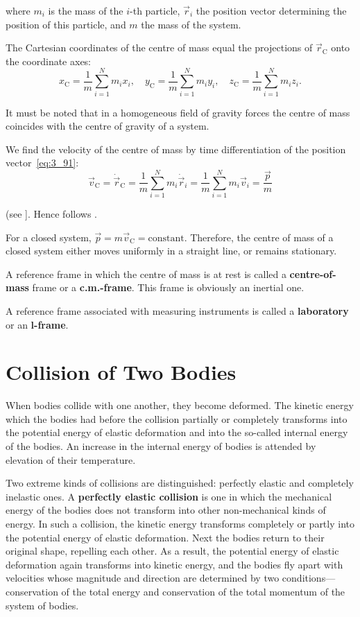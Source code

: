 \noindent
where $m_i$ is the mass of the $i$-th particle, $\vec{r}_i$ the position vector determining the position of this particle, and  $m$ the mass of the system.

The Cartesian coordinates of the centre of mass equal the projections of $\vec{r}_{\text{C}}$ onto the coordinate axes:
\begin{equation}\label{eq:3_92}
x_{\text{C}} = \frac{1}{m} \sum_{i=1}^N m_i x_i,\quad y_{\text{C}} = \frac{1}{m} \sum_{i=1}^N m_i y_i,\quad
z_{\text{C}} = \frac{1}{m} \sum_{i=1}^N m_i z_i.
\end{equation}

\noindent
It must be noted that in a homogeneous field of gravity forces the centre of mass coincides with the centre of gravity of a system.

We find the velocity of the centre of mass by time differentiation of the position vector~\eqref{eq:3_91}:
\begin{equation*}
\vec{v}_{\text{C}} = \dot{\vec{r}}_{\text{C}} = \frac{1}{m}\sum_{i=1}^N m_i\dot{\vec{r}}_i = \frac{1}{m} \sum_{i=1}^N m_i\vec{v}_i = \frac{\vec{p}}{m}
\end{equation*}

\noindent
(see ]. Hence follows .

For a closed system, $\vec{p}=m\vec{v}_{\text{C}}=\text{constant}$. Therefore, the centre of mass of a closed system either moves uniformly in a straight line, or remains stationary.

A reference frame in which the centre of mass is at rest is called a \textbf{centre-of-mass} frame or a \textbf{c.m.-frame}. This frame is obviously an inertial one.

A reference frame associated with measuring instruments is called a \textbf{laboratory} or an \textbf{l-frame}.

\section{Collision of Two Bodies}\label{sec:3_11}

When bodies collide with one another, they become deformed.  The kinetic energy which the bodies had before the collision partially or completely transforms into the potential energy of elastic deformation and into the so-called internal energy of the bodies. An increase in the internal energy of bodies is attended by elevation of their temperature.

Two extreme kinds of collisions are distinguished: perfectly elastic and completely inelastic ones. A \textbf{perfectly elastic collision} is one in which the mechanical energy of the bodies does not transform into other non-mechanical kinds of energy. In such a collision, the kinetic energy transforms completely or partly into the potential energy of elastic deformation. Next the bodies return to their original shape, repelling each other. As a result, the potential energy of elastic deformation again transforms into kinetic energy, and the bodies fly apart with velocities whose magnitude and direction are determined by two conditions---conservation of the total energy and conservation of the total momentum of the system of bodies.

